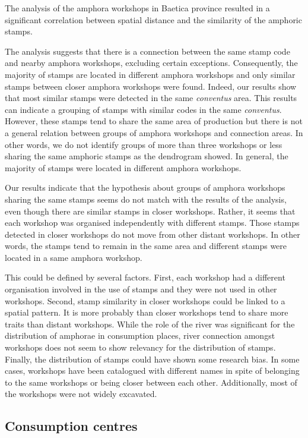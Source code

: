 \documentclass[review]{elsarticle}
\begin{document}
The analysis of the amphora workshops in Baetica province resulted in a significant correlation between spatial distance and the similarity of the amphoric stamps. 

The analysis suggests that there is  a connection between the same stamp code and nearby amphora workshops, excluding certain exceptions. Consequently, the majority of stamps are located in different amphora workshops and only similar stamps between closer amphora workshops were found. Indeed, our results show that most similar stamps were detected in the same \textit{conventus} area. This results can indicate a grouping of stamps with similar codes in the same \textit{conventus}. However, these stamps tend to share the same area of production but there is not a general relation between groups of amphora workshops and connection areas. In other words, we do not identify groups of more than three workshops or less sharing the same amphoric stamps as the dendrogram showed. In general, the majority of stamps were located in different amphora workshops. 


Our results indicate that the hypothesis about groups of amphora workshops sharing the same stamps seems do not match with the results of the analysis, even though there are similar stamps in closer workshops. Rather, it seems that each workshop was organised independently with different stamps. Those stamps detected in closer workshops do not move from other distant workshops. In other words, the stamps tend to remain in the same area and different stamps were located in a same amphora workshop. 

This could be defined by several factors. First, each workshop had a different organisation involved in the use of stamps and they were not used in other workshops. Second, stamp similarity in closer workshops could be linked to a spatial pattern. It is more probably than closer workshops tend to share more traits than distant workshops. While the role of the river was significant for the distribution of amphorae in consumption places, river connection amongst workshops does not seem to show relevancy for the distribution of stamps. Finally, the distribution of stamps could have shown some research bias. In some cases, workshops have been catalogued with different names in spite of belonging to the same workshops or being closer between each other. Additionally, most of the workshops were not widely excavated. 


\subsection{Consumption centres}
\end{document}
